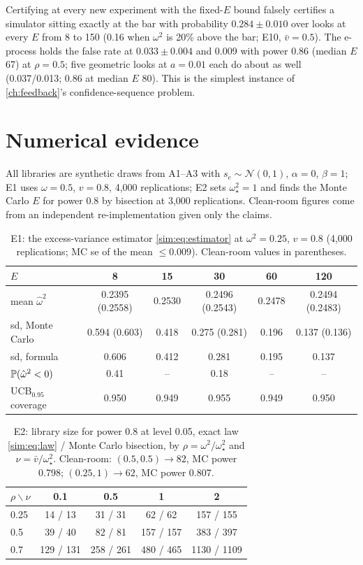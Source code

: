 Certifying at every new experiment with the fixed-$E$ bound falsely certifies a simulator sitting exactly at the bar with probability $0.284 \pm 0.010$ over looks at every $E$ from 8 to 150 (0.16 when $\omega^2$ is 20\% above the bar; E10, $\bar v = 0.5$). The e-process holds the false rate at $0.033 \pm 0.004$ and 0.009 with power 0.86 (median $E$ 67) at $\rho = 0.5$; five geometric looks at $a = 0.01$ each do about as well (0.037/0.013; 0.86 at median $E$ 80). This is the simplest instance of \cref{ch:feedback}'s confidence-sequence problem.

\section{Numerical evidence}
\label{sim:sec:numerics}

All libraries are synthetic draws from A1--A3 with $s_e \sim \mathcal N(0, 1)$, $\alpha = 0$, $\beta = 1$; E1 uses $\omega = 0.5$, $v = 0.8$, 4,000 replications; E2 sets $\omega_\star^2 = 1$ and finds the Monte Carlo $E$ for power 0.8 by bisection at 3,000 replications. Clean-room figures come from an independent re-implementation given only the claims.

\begin{table}[htbp]
\centering\small
\caption{E1: the excess-variance estimator \cref{sim:eq:estimator} at $\omega^2 = 0.25$, $v = 0.8$ (4,000 replications; MC se of the mean $\le 0.009$). Clean-room values in parentheses.}
\label{sim:tab:estimator}
\begin{tabular}{lccccc}
\toprule
$E$ & 8 & 15 & 30 & 60 & 120 \\
\midrule
mean $\hat\omega^2$ & 0.2395 (0.2558) & 0.2530 & 0.2496 (0.2543) & 0.2478 & 0.2494 (0.2483) \\
sd, Monte Carlo & 0.594 (0.603) & 0.418 & 0.275 (0.281) & 0.196 & 0.137 (0.136) \\
sd, formula & 0.606 & 0.412 & 0.281 & 0.195 & 0.137 \\
$\mathbb{P}(\hat\omega^2 < 0)$ & 0.41 & -- & 0.18 & -- & -- \\
UCB$_{0.95}$ coverage & 0.950 & 0.949 & 0.955 & 0.949 & 0.950 \\
\bottomrule
\end{tabular}
\end{table}

\begin{table}[htbp]
\centering\small
\caption{E2: library size for power 0.8 at level 0.05, exact law \cref{sim:eq:law} / Monte Carlo bisection, by $\rho = \omega^2/\omega_\star^2$ and $\nu = \bar v/\omega_\star^2$. Clean-room: $(0.5, 0.5) \to 82$, MC power 0.798; $(0.25, 1) \to 62$, MC power 0.807.}
\label{sim:tab:law}
\begin{tabular}{lcccc}
\toprule
$\rho \backslash \nu$ & 0.1 & 0.5 & 1 & 2 \\
\midrule
0.25 & 14 / 13 & 31 / 31 & 62 / 62 & 157 / 155 \\
0.5 & 39 / 40 & 82 / 81 & 157 / 157 & 383 / 397 \\
0.7 & 129 / 131 & 258 / 261 & 480 / 465 & 1130 / 1109 \\
\bottomrule
\end{tabular}
\end{table}

